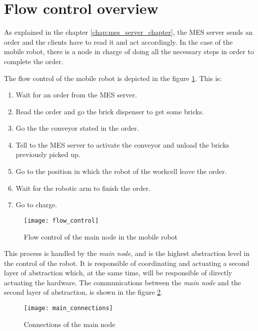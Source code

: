 \section{Flow control overview} %
\label{sec:mr_flow_control_overview}

As explained in the chapter \ref{chap:mes_server_chapter}, the MES server sends an order and the clients have to read it and act accordingly.
In the case of the mobile robot, there is a node in charge of doing all the necessary steps in order to complete the order.

The flow control of the mobile robot is depicted in the figure \ref{fig:flow_control}.
This is:
\begin{enumerate}
	\item Wait for an order from the MES server.
	\item Read the order and go the brick dispenser to get some bricks.
	\item Go the the conveyor stated in the order.
	\item Tell to the MES server to activate the conveyor and unload the bricks previously picked up.
	\item Go to the position in which the robot of the workcell leave the order.
	\item Wait for the robotic arm to finish the order.
	\item Go to charge.
\end{enumerate}

\begin{figure}[H]
	\centering
	\texttt{[image: flow\_control]}
	\caption{Flow control of the main node in the mobile robot}
	\label{fig:flow_control}
\end{figure}

This process is handled by the \emph{main node}, and is the highest abstraction level in the control of the robot.
It is responsible of coordinating and actuating a second layer of abstraction which, at the same time, will be responsible of directly actuating the hardware.
The communications between the \emph{main node} and the second layer of abstraction, is shown in the figure \ref{fig:main_connections}.

\begin{figure}[H]
	\centering
	\texttt{[image: main\_connections]}
	\caption{Connections of the main node}
	\label{fig:main_connections}
\end{figure}


